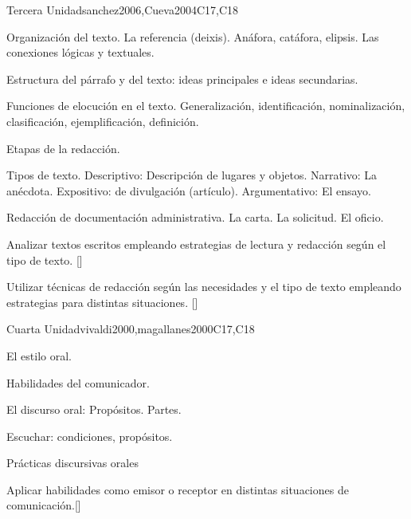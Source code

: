 \begin{syllabus}
\begin{unit}{}{Tercera Unidad}{sanchez2006,Cueva2004}{}{C17,C18}
\begin{topics}
	\item Organización del texto.
		\subitem La referencia (deixis).
		\subitem Anáfora, catáfora, elipsis.
		\subitem Las conexiones lógicas y textuales.
	\item Estructura del párrafo y del texto: ideas principales  e ideas secundarias.
	\item Funciones de elocución en el texto.
		\subitem Generalización, identificación, nominalización, clasificación, ejemplificación, definición.
	\item Etapas de la redacción.
	\item Tipos de texto.
		\subitem Descriptivo: Descripción de lugares y objetos.
		\subitem Narrativo: La anécdota.
		\subitem Expositivo: de divulgación (artículo). 
		\subitem Argumentativo: El ensayo.
	\item Redacción de documentación administrativa.
		\subitem La carta.
		\subitem La solicitud.
		\subitem El oficio.
\end{topics}

\begin{learningoutcomes}
   \item Analizar textos escritos empleando estrategias de lectura y redacción según el tipo de texto. [\Familiarity]
   \item Utilizar técnicas de redacción  según las necesidades y el tipo de texto empleando estrategias para distintas situaciones. [\Usage]
\end{learningoutcomes}
\end{unit}

\begin{unit}{}{Cuarta Unidad}{vivaldi2000,magallanes2000}{}{C17,C18}
\begin{topics}
	\item El estilo oral.
	\item Habilidades del comunicador.
	\item El discurso oral: 
		\subitem Propósitos.
		\subitem Partes.
	\item Escuchar: condiciones, propósitos.
	\item Prácticas discursivas orales
\end{topics}
\begin{learningoutcomes}
   \item Aplicar habilidades como emisor o receptor en distintas situaciones de comunicación.[\Usage]
\end{learningoutcomes}
\end{unit}

\begin{coursebibliography}
\end{coursebibliography}

\end{syllabus}
